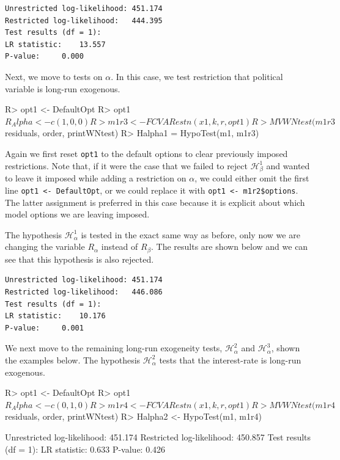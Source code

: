 \documentclass[article]{jss}
\begin{document}
\begin{verbatim}
Unrestricted log-likelihood: 451.174
Restricted log-likelihood:   444.395
Test results (df = 1):
LR statistic: 	 13.557
P-value: 	 0.000
\end{verbatim}

Next, we move to tests on $\alpha$. 
In this case, we test restriction that political variable is long-run exogenous.

\begin{Code}
R> opt1 <- DefaultOpt
R> opt1$R_Alpha <- c(1, 0, 0)
R> m1r3 <- FCVARestn(x1, k, r, opt1)
R> MVWNtest(m1r3$residuals, order, printWNtest)
R> Halpha1 = HypoTest(m1, m1r3)
\end{Code}

Again we first reset \verb|opt1| to the default options to clear previously imposed restrictions. Note that, if it were the case that we failed to reject $\mathscr{H}_{\beta}^1$ and wanted to leave it imposed while adding a restriction on $\alpha$, we could either omit the first line \verb|opt1 <- DefaultOpt|, or we could replace it with \verb|opt1 <- m1r2$options|. The latter assignment is preferred in this case because it is explicit about which model options we are leaving imposed.

The hypothesis $\mathscr{H}_{\alpha}^1$ is tested in the exact same way as before, only now we are changing the variable $R_{\alpha}$ instead of $R_{\beta}$. The results are shown below and we can see that this hypothesis is also rejected.

\begin{verbatim}
Unrestricted log-likelihood: 451.174
Restricted log-likelihood:   446.086
Test results (df = 1):
LR statistic: 	 10.176
P-value: 	 0.001
\end{verbatim}

We next move to the remaining long-run exogeneity tests, $\mathscr{H}_{\alpha}^2$ and $\mathscr{H}_{\alpha}^3$, shown
the examples below.
The hypothesis $\mathscr{H}_{\alpha}^2$ tests that the interest-rate is long-run exogenous.

\begin{CodeChunk} 
\begin{CodeInput}
R> opt1 <- DefaultOpt
R> opt1$R_Alpha <- c(0, 1, 0)
R> m1r4 <- FCVARestn(x1, k, r, opt1)
R> MVWNtest(m1r4$residuals, order, printWNtest)
R> Halpha2 <- HypoTest(m1, m1r4)
\end{CodeInput}
\begin{CodeOutput}
Unrestricted log-likelihood: 451.174
Restricted log-likelihood:   450.857
Test results (df = 1):
LR statistic: 	 0.633
P-value: 	 0.426
\end{CodeOutput}
\end{CodeChunk}  
\end{document}
